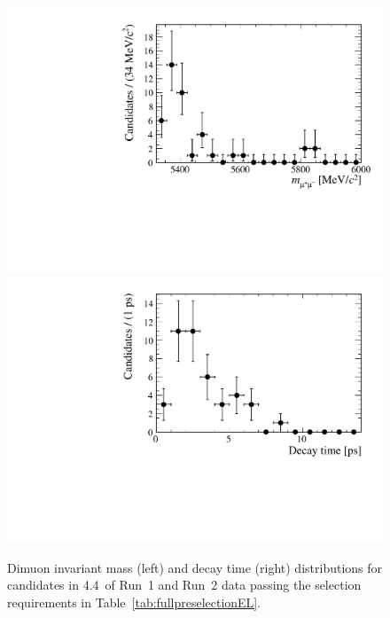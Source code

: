 \begin{figure}[htbp]
    \centering
        \includegraphics[width=0.49 \textwidth]{./Figs/Selection/mass_candidates.pdf}
        \includegraphics[width=0.49 \textwidth]{./Figs/Selection/lifetime_candidates.pdf}
    \caption{Dimuon invariant mass (left) and decay time (right) distributions for \bsmumu candidates in 4.4~\fb of Run~1 and Run~2 data passing the selection requirements in Table~\ref{tab:fullpreselectionEL}. }
    \label{fig:mass_DT}
\end{figure}
